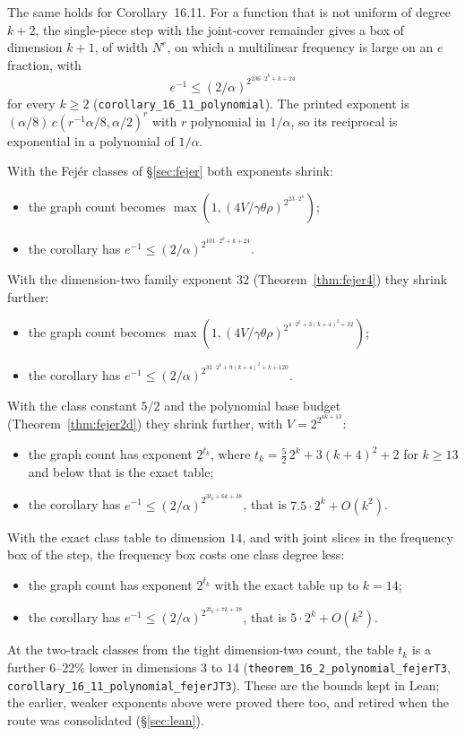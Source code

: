\documentclass[11pt]{article}
\theoremstyle{definition}
\theoremstyle{remark}
\newcommand{\lean}[1]{\texttt{#1}}
\begin{document}
The same holds for Corollary~16.11. For a function that is not uniform of
degree $k+2$, the single-piece step with the joint-cover remainder gives a
box of dimension $k+1$, of width $N^e$, on which a multilinear frequency is
large on an $e$ fraction, with
\[
  e^{-1}\le(2/\alpha)^{2^{236\cdot2^k+k+24}}
\]
for every $k\ge2$ (\lean{corollary\_16\_11\_polynomial}). The printed exponent
is $(\alpha/8)\,c(r^{-1}\alpha/8,\alpha/2)^{r}$ with $r$ polynomial in
$1/\alpha$, so its reciprocal is exponential in a polynomial of $1/\alpha$.

With the Fej\'er classes of \S\ref{sec:fejer} both exponents shrink:
\begin{itemize}
\item the graph count becomes
  $\max(1,(4V/\gamma\theta\rho)^{2^{23\cdot2^k}})$;
\item the corollary has $e^{-1}\le(2/\alpha)^{2^{101\cdot2^k+k+24}}$.
\end{itemize}
With the dimension-two family exponent $32$ (Theorem~\ref{thm:fejer4}) they
shrink further:
\begin{itemize}
\item the graph count becomes
  $\max(1,(4V/\gamma\theta\rho)^{2^{4\cdot2^k+3(k+4)^2+32}})$;
\item the corollary has $e^{-1}\le(2/\alpha)^{2^{32\cdot2^k+9(k+4)^2+k+120}}$.
\end{itemize}
With the class constant $5/2$ and the polynomial base budget
(Theorem~\ref{thm:fejer2d}) they shrink further, with $V=2^{2^{4k+13}}$:
\begin{itemize}
\item the graph count has exponent $2^{t_k}$, where
  $t_k=\tfrac52\,2^{k}+3(k+4)^2+2$ for $k\ge13$ and below that is the exact
  table;
\item the corollary has $e^{-1}\le(2/\alpha)^{2^{3t_k+6k+38}}$, that is
  $7.5\cdot2^k+O(k^2)$.
\end{itemize}
With the exact class table to dimension $14$, and with joint slices in the
frequency box of the step, the frequency box costs one class degree less:
\begin{itemize}
\item the graph count has exponent $2^{t_k}$ with the exact table up to
  $k=14$;
\item the corollary has $e^{-1}\le(2/\alpha)^{2^{2t_k+7k+38}}$, that is
  $5\cdot2^k+O(k^2)$.
\end{itemize}
{\sloppy At the two-track classes from the tight dimension-two count, the table $t_k$
is a further 6--22\% lower in dimensions $3$ to $14$
(\lean{theorem\_16\_2\_polynomial\_fejerT3}, \lean{corollary\_16\_11\_polynomial\_fejerJT3}).
These are the bounds kept in Lean; the earlier, weaker exponents above
were proved there too, and retired when the route was consolidated
(\S\ref{sec:lean}).\par}
\end{document}
